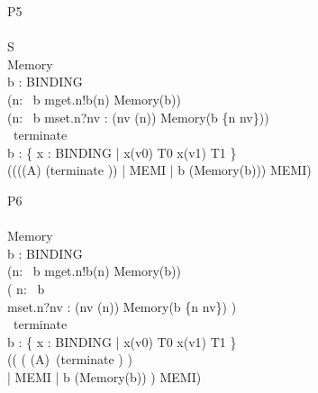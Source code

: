 \begin{circus}
\circprocess P5\circdef\\ 
		\circbegin\\ 
			\circstate S \\ 
			Memory \circdef\\
				\circvres b : BINDING \circspot \\
				(\Extchoice n: \dom\ b \circspot mget.n!b(n) \then Memory(b))\\
				\extchoice 
				(\Extchoice n: \dom\ b \circspot mset.n?nv : (nv \in \delta(n)) \then Memory(b \oplus \{n \mapsto nv\}))\\
				\extchoice~terminate \then \Skip\\
			\circspot \circvar b : 
				\{
				x : BINDING |  
					x(v0) \in T0 \land x(v1) \in T1
				\} \circspot\\
				(((\OmegaA(A) \circseq (terminate \then \Skip ))
									\lpar \emptyset | MEMI | {b} \rpar (Memory(b))) \circhide MEMI)
	\circend\\
\end{circus}

\begin{circus}
\circprocess P6\circdef\\ 
		\circbegin\\ 
			Memory \circdef\\
				\circvres b : BINDING \circspot \\
				(\Extchoice n: \dom\ b \circspot mget.n!b(n) \then Memory(b))\\
				\extchoice (
				\Extchoice n: \dom\ b \circspot\\
				mset.n?nv : (nv \in \delta(n)) \then Memory(b \oplus \{n \mapsto nv\})
				)\\
				\extchoice~terminate \then \Skip\\
			\circspot \circvar b : 
				\{
				x : BINDING |  
					x(v0) \in T0 \land x(v1) \in T1
				\} \circspot\\
					((
						(
							\OmegaA(A)\circseq\ (terminate \then \Skip)
						)\\
						\lpar \emptyset | MEMI | {b} \rpar (Memory(b)) ) \circhide MEMI)\\
	\circend\\
\end{circus}